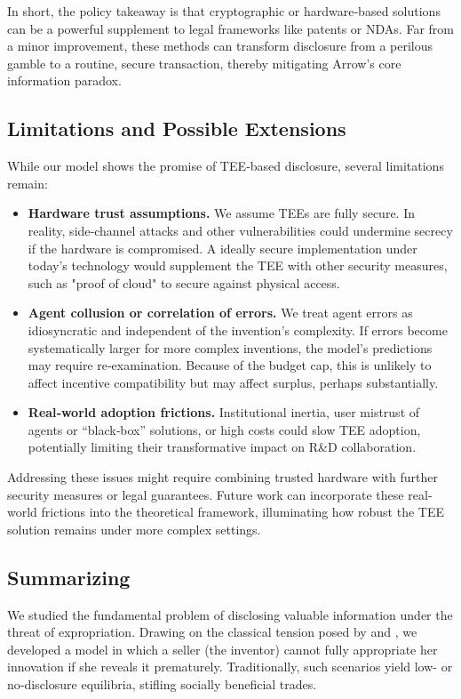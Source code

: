 \documentclass{article}
\begin{document}
In short, the policy takeaway is that cryptographic or hardware‐based solutions can be a powerful supplement to legal frameworks like patents or NDAs. Far from a minor improvement, these methods can transform disclosure from a perilous gamble to a routine, secure transaction, thereby mitigating Arrow’s core information paradox.

\subsection{Limitations and Possible Extensions}
\label{sec:limitations}

While our model shows the promise of TEE‐based disclosure, several limitations remain:

\begin{itemize}
    \item \textbf{Hardware trust assumptions.} We assume TEEs are fully secure. In reality, side‐channel attacks and other vulnerabilities could undermine secrecy if the hardware is compromised. A ideally secure implementation under today's technology would supplement the TEE with other security measures, such as "proof of cloud" to secure against physical access.
    \item \textbf{Agent collusion or correlation of errors.} We treat agent errors as idiosyncratic and independent of the invention’s complexity. If errors become systematically larger for more complex inventions, the model’s predictions may require re‐examination. Because of the budget cap, this is unlikely to affect incentive compatibility but may affect surplus, perhaps substantially.
    \item \textbf{Real‐world adoption frictions.} Institutional inertia, user mistrust of agents or “black‐box” solutions, or high costs could slow TEE adoption, potentially limiting their transformative impact on R\&D collaboration.
\end{itemize}

Addressing these issues might require combining trusted hardware with further security measures or legal guarantees. Future work can incorporate these real‐world frictions into the theoretical framework, illuminating how robust the TEE solution remains under more complex settings.

\subsection{Summarizing}

We studied the fundamental problem of disclosing valuable information under the threat of expropriation. Drawing on the classical tension posed by \citet{arrow1971essays} and \citet{nelson1959simple}, we developed a model in which a seller (the inventor) cannot fully appropriate her innovation if she reveals it prematurely. Traditionally, such scenarios yield low- or no‐disclosure equilibria, stifling socially beneficial trades.
\end{document}
